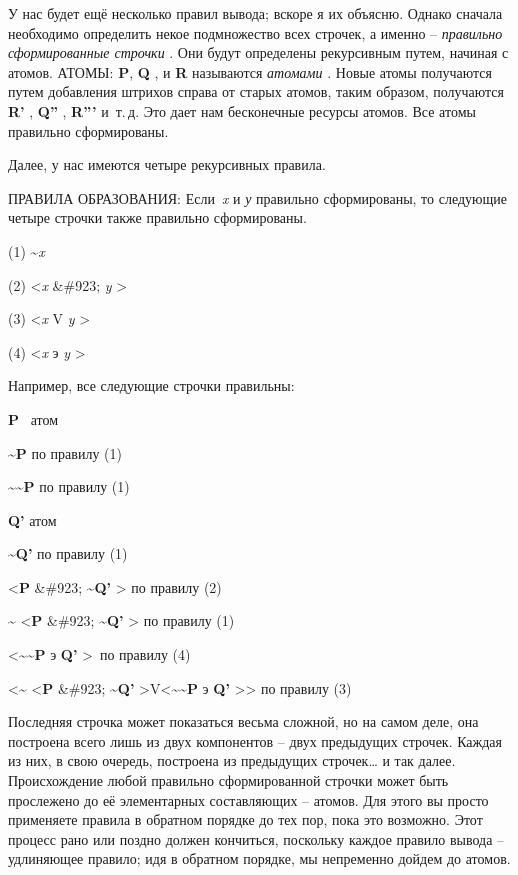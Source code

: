 \documentclass[../main.tex]{subfiles}
\begin{document}
У нас будет ещё несколько правил вывода; вскоре я их объясню. Однако сначала необходимо определить некое подмножество всех строчек, а именно \--- \emph{правильно сформированные строчки} . Они будут определены рекурсивным путем, начиная с атомов. АТОМЫ: \textbf{P}, \textbf{Q} , и \textbf{R} называются \emph{атомами} . Новые атомы получаются путем добавления штрихов справа от старых атомов, таким образом, получаются \textbf{R'} , \textbf{Q''} , \textbf{R'''} и~т.\,д. Это дает нам бесконечные ресурсы атомов. Все атомы правильно сформированы.

Далее, у нас имеются четыре рекурсивных правила.

ПРАВИЛА ОБРАЗОВАНИЯ: Если~\emph{x} и \emph{у} правильно сформированы, то следующие четыре строчки также правильно сформированы.

(1) \textasciitilde{}\emph{x}

(2) \textless{}\emph{x} \&\#923; \emph{y} \textgreater{}

(3) \textless{}\emph{x} V \emph{y} \textgreater{}

(4) \textless{}\emph{x} э \emph{y} \textgreater{}

Например, все следующие строчки правильны:

\textbf{P} ~атом

\textbf{\textasciitilde P} по правилу (1)

\textbf{\textasciitilde\textasciitilde P} по правилу (1)

\textbf{Q'} атом

\textbf{\textasciitilde Q'} по правилу (1)

\textless{}\textbf{P} \&\#923; \textbf{\textasciitilde Q'} \textgreater{} по правилу (2)

\textbf{\textasciitilde{}} \textless{}\textbf{P} \&\#923; \textbf{\textasciitilde Q'} \textgreater{} по правилу (1)

\textless{}\textbf{\textasciitilde\textasciitilde P} э \textbf{Q'} \textgreater~по правилу (4)

\textless{}\textbf{\textasciitilde{}} \textless{}\textbf{P} \&\#923; \textbf{\textasciitilde Q'} \textgreater V\textless{}\textbf{\textasciitilde\textasciitilde P} э \textbf{Q'} \textgreater\textgreater{} по правилу (3)

Последняя строчка может показаться весьма сложной, но на самом деле, она построена всего лишь из двух компонентов \--- двух предыдущих строчек. Каждая из них, в свою очередь, построена из предыдущих строчек\ldots{} и так далее. Происхождение любой правильно сформированной строчки может быть прослежено до её элементарных составляющих \--- атомов. Для этого вы просто применяете правила в обратном порядке до тех пор, пока это возможно. Этот процесс рано или поздно должен кончиться, поскольку каждое правило вывода \--- удлиняющее правило; идя в обратном порядке, мы непременно дойдем до атомов.
\end{document}
